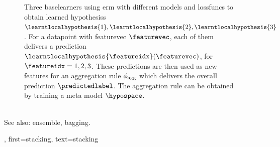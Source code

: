 {{\begin{figure}[htbp]
\begin{center}
		\caption{Three \glspl{baselearner} using \gls{erm} with 
		different \glspl{model} and \glspl{lossfunc} to obtain learned \glspl{hypothesis} 
		$\learntlocalhypothesis{1},\learntlocalhypothesis{2},\learntlocalhypothesis{3}$. 
		For a \gls{datapoint} with \gls{featurevec} $\featurevec$, each of them delivers a \gls{prediction}  
		$\learntlocalhypothesis{\featureidx}(\featurevec)$, for $\featureidx=1,2,3$. These 
		\glspl{prediction} are then used as new \glspl{feature} for an aggregation 
		rule $\phi_{\rm agg}$ which delivers the overall \gls{prediction} $\predictedlabel$. 
		The aggregation rule can be obtained by training a meta \gls{model} $\hypospace$.}
		\end{center}
		\end{figure}
		\\
	 	See also: \gls{ensemble}, \gls{bagging}.},
	 first={stacking},
	 text={stacking} 
}

